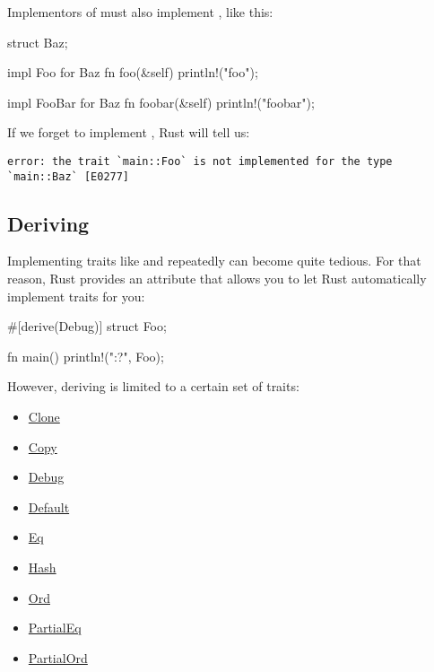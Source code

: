 Implementors of  must also implement , like this:

\begin{rustc}
struct Baz;

impl Foo for Baz {
    fn foo(&self) { println!("foo"); }
}

impl FooBar for Baz {
    fn foobar(&self) { println!("foobar"); }
}
\end{rustc}

If we forget to implement , Rust will tell us:

\begin{verbatim}
error: the trait `main::Foo` is not implemented for the type `main::Baz` [E0277]
\end{verbatim}

\subsection*{Deriving}

Implementing traits like  and  repeatedly can become quite tedious. For that reason, Rust provides an attribute 
that allows you to let Rust automatically implement traits for you:

\begin{rustc}
#[derive(Debug)]
struct Foo;

fn main() {
    println!("{:?}", Foo);
}
\end{rustc}

However, deriving is limited to a certain set of traits:

\begin{itemize}
  \item{\href{https://doc.rust-lang.org/core/clone/trait.Clone.html}{Clone}}
  \item{\href{https://doc.rust-lang.org/core/marker/trait.Copy.html}{Copy}}
  \item{\href{https://doc.rust-lang.org/core/fmt/trait.Debug.html}{Debug}}
  \item{\href{https://doc.rust-lang.org/core/default/trait.Default.html}{Default}}
  \item{\href{https://doc.rust-lang.org/core/cmp/trait.Eq.html}{Eq}}
  \item{\href{https://doc.rust-lang.org/core/hash/trait.Hash.html}{Hash}}
  \item{\href{https://doc.rust-lang.org/core/cmp/trait.Ord.html}{Ord}}
  \item{\href{https://doc.rust-lang.org/core/cmp/trait.PartialEq.html}{PartialEq}}
  \item{\href{https://doc.rust-lang.org/core/cmp/trait.PartialOrd.html}{PartialOrd}}
\end{itemize}
